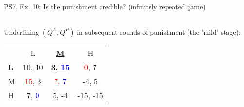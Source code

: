 \begin{frame}{PS7, Ex. 10: Is the punishment credible? (infinitely repeated game)}
\begin{multicols}{2}
\begin{table}
\begin{tabular}{l|c|c|c|}
      \end{tabular}
    \end{table}
    Underlining $(Q^D,Q^P)$ in subsequent rounds of punishment (the 'mild' stage):
    \vspace{-6pt}
    \begin{table}
      \begin{tabular}{l|c|c|c|}
        \multicolumn{1}{c}{} & \multicolumn{1}{c}{L} & \multicolumn{1}{c}{\textbf{\underline{M}}} & \multicolumn{1}{c}{H} \\\cline{2-4}
        \textbf{\underline{L}} & 10, 10 & \textbf{\underline{3, \textcolor{blue}{15}}} & \textcolor{red}{0}, 7 \\\cline{2-4}
        M & \textcolor{red}{15}, 3 & \textcolor{red}{7}, \textcolor{blue}{7} & -4, 5 \\\cline{2-4}
        H & 7, \textcolor{blue}{0} & 5, -4 & -15, -15 \\\cline{2-4}
      \end{tabular}
    \end{table}
    \vfill\null
  \end{multicols}
  \vfill\null
\end{frame}
